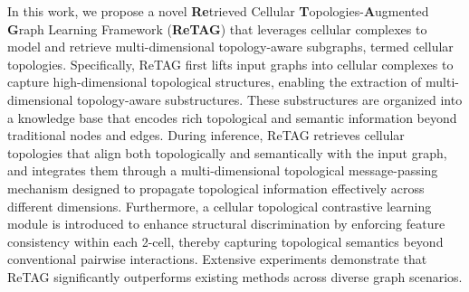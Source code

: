 
In this work, we propose a novel \textbf{Re}trieved Cellular \textbf{T}opologies-\textbf{A}ugmented \textbf{G}raph Learning Framework (\textbf{ReTAG}) that leverages cellular complexes to model and retrieve multi-dimensional topology-aware subgraphs, termed cellular topologies. Specifically, ReTAG first lifts input graphs into cellular complexes to capture high-dimensional topological structures, enabling the extraction of multi-dimensional topology-aware substructures. These substructures are organized into a knowledge base that encodes rich topological and semantic information beyond traditional nodes and edges. During inference, ReTAG retrieves cellular topologies that align both topologically and semantically with the input graph, and integrates them through a multi-dimensional topological message-passing mechanism designed to propagate topological information effectively across different dimensions. Furthermore, a cellular topological contrastive learning module is introduced to enhance structural discrimination by enforcing feature consistency within each 2-cell, thereby capturing topological semantics beyond conventional pairwise interactions. %
Extensive experiments demonstrate that ReTAG significantly outperforms existing methods across diverse graph scenarios.



